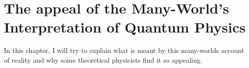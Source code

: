 \chapter{The appeal of the Many-World's Interpretation of Quantum Physics}
In this chapter, I will try to explain what is meant by this many-worlds account of reality and why some theoretical physicists find it so appealing.